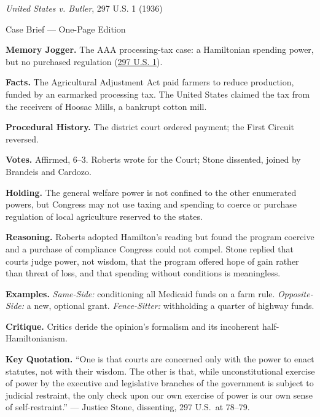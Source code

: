 \documentclass[12pt]{article}
\begin{document}
\begin{center}
{\Large \textit{United States v. Butler}, 297 U.S. 1 (1936)\par}
\vspace{0.3em}
{\normalsize Case Brief --- One-Page Edition\par}
\end{center}

\textbf{Memory Jogger.} The AAA processing-tax case: a Hamiltonian spending power, but no purchased regulation (\href{https://supreme.justia.com/cases/federal/us/297/1/}{297 U.S. 1}).

\textbf{Facts.} The Agricultural Adjustment Act paid farmers to reduce production, funded by an earmarked processing tax. The United States claimed the tax from the receivers of Hoosac Mills, a bankrupt cotton mill.

\textbf{Procedural History.} The district court ordered payment; the First Circuit reversed.

\textbf{Votes.} Affirmed, 6--3. Roberts wrote for the Court; Stone dissented, joined by Brandeis and Cardozo.

\textbf{Holding.} The general welfare power is not confined to the other enumerated powers, but Congress may not use taxing and spending to coerce or purchase regulation of local agriculture reserved to the states.

\textbf{Reasoning.} Roberts adopted Hamilton's reading but found the program coercive and a purchase of compliance Congress could not compel. Stone replied that courts judge power, not wisdom, that the program offered hope of gain rather than threat of loss, and that spending without conditions is meaningless.

\textbf{Examples.} \emph{Same-Side:} conditioning all Medicaid funds on a farm rule. \emph{Opposite-Side:} a new, optional grant. \emph{Fence-Sitter:} withholding a quarter of highway funds.

\textbf{Critique.} Critics deride the opinion's formalism and its incoherent half-Hamiltonianism.

\textbf{Key Quotation.} ``One is that courts are concerned only with the power to enact statutes, not with their wisdom. The other is that, while unconstitutional exercise of power by the executive and legislative branches of the government is subject to judicial restraint, the only check upon our own exercise of power is our own sense of self-restraint.'' --- Justice Stone, dissenting, 297 U.S.\ at 78--79.
\end{document}

